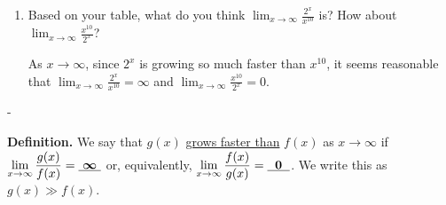 \documentclass{article}
\makeatletter
\newlength{\tipmargin}
\renewenvironment{framed}{
  \setlength{\tipmargin}{\textwidth-\linewidth}
  \advance\@totalleftmargin-\tipmargin
  \def\FrameCommand{\hspace{\tipmargin}\fbox}%
  \advance\linewidth\tipmargin
  \MakeFramed {\advance\hsize-\width \FrameRestore}%
}
{\endMakeFramed}
\makeatother
\begin{document}
\begin{enumerate}
\begin{enumerate}

    \begin{problem}[\vfill]
      Does this change your answer to (a)?
    \end{problem}

    \begin{solution}
      We can see that $2^x$ is initially smaller than $x^{10}$,
      but it eventually grows to be much, much larger than $x^{10}$.
      We write this as $2^x \gg x^{10}$. The graph in part (a)
      ends before showing how $2^x$ overtakes $x^{10}$.
    \end{solution}

  \item

    \begin{problem}[\vfill]
      Based on your table, what do you think $\displaystyle \lim_{x \to \infty} \frac{2^x}{x^{10}}$ is? How about $\displaystyle \lim_{x \to \infty} \frac{x^{10}}{2^x}$?
    \end{problem}

    \begin{solution}
      As $x\to \infty$, since $2^x$ is growing so much faster than
      $x^{10}$, it seems reasonable that 
      $\displaystyle \lim_{x \to \infty} \frac{2^x}{x^{10}} = \infty$
      and
      $\displaystyle \lim_{x \to \infty} \frac{x^{10}}{2^x}=0$.
    \end{solution}

  \end{enumerate}

\end{enumerate}

\begin{problemonly}
  \begin{framed}
    \textbf{Definition.} We say that $g(x)$ \uline{grows faster than} $f(x)$ as $x \to \infty$ if $\displaystyle \lim_{x \to \infty} \frac{g(x)}{f(x)} = \cfitb{0.25in}{\infty}$ or, equivalently, $\displaystyle \lim_{x \to \infty} \frac{f(x)}{g(x)} = \cfitb{0.25in}{0}$. We write this as $g(x) \gg f(x)$.
  \end{framed}
\end{problemonly}
\end{document}
